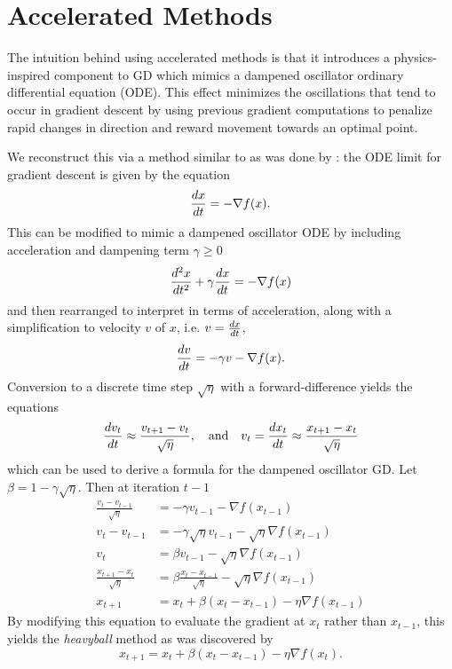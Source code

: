 \section{Accelerated Methods}

The intuition behind using accelerated methods is that it introduces a
physics-inspired component to GD which mimics a dampened oscillator ordinary
differential equation (ODE). This effect minimizes the oscillations that tend to
occur in gradient descent by using previous gradient computations to penalize
rapid changes in direction and reward movement towards an optimal point.

We reconstruct this via a method similar to as was done by
\citeauthor{10.1214/18-EJS1395}: the ODE limit for gradient descent is given by
the equation
\begin{equation}
    \frac{d x}{d t} = -\nabla f(x).
\end{equation}
This can be modified to mimic a dampened oscillator ODE by including acceleration
and dampening term $\gamma \geq 0$
\begin{equation}
    \frac{d ^2 x}{d t^2}  + \gamma \frac{d x}{d t} = -\nabla f(x)
\end{equation}
and then rearranged to interpret in terms of acceleration, along with a
simplification to velocity $v$ of $x$, i.e.  $v = \frac{d x}{d t}$,
\begin{equation}
    \frac{d v}{d t}  =  -\gamma v -\nabla f(x).
\end{equation}
Conversion to a discrete time step $\sqrt{\eta}$ with a forward-difference yields the equations
\begin{equation}
    \label{eq:der}
    \frac{d v_t}{d t} \approx \frac{v_{t + 1} - v_t}{\sqrt{\eta}}, \quad \text{and}
    \quad v_{t} = \frac{d x_t}{d t} \approx \frac{x_{t + 1} - x_t}{\sqrt{\eta}}
\end{equation}
which can be used to derive a formula for the dampened oscillator GD. Let $\beta
= 1 - \gamma \sqrt{\eta}$. Then at iteration $t - 1$
\begin{equation}
    \label{eq:formula}
    \begin{aligned}
        \frac{v_{t} - v_{t - 1}}{\sqrt{\eta}} &= -\gamma v_{t - 1} -\nabla
        f(x_{t - 1}) \\
        v_{t} - v_{t - 1} &= -\gamma\sqrt\eta v_{t - 1} -\sqrt \eta \nabla
        f(x_{t - 1}) \\
        v_{t} &= \beta v_{t - 1} - \sqrt{\eta} \nabla f(x_{t - 1})\\
        \frac{x_{t + 1} - x_t}{\sqrt{\eta}} &= \beta \frac{x_{t}
        - x_{t - 1}}{\sqrt{\eta}} - \sqrt{\eta} \nabla f(x_{t - 1}) \\
        x_{t + 1} &= x_t + \beta (x_{t} - x_{t - 1}) - \eta \nabla f(x_{t - 1})
    \end{aligned}
\end{equation}
By modifying this equation to evaluate the gradient at $x_t$ rather
than $x_{t - 1}$, this yields the \emph{heavyball} method as was discovered by
\citeauthor{heavyball}
\begin{equation}
    \label{eq:heavyball}
        x_{t + 1} = x_t + \beta (x_{t} - x_{t - 1}) - \eta \nabla f(x_t).
\end{equation}


